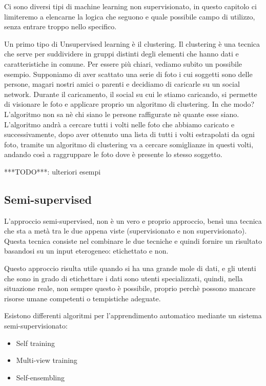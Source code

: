 \documentclass[12pt,italian]{report}
\begin{document}
Ci sono diversi tipi di machine learning non supervisionato, in questo capitolo ci limiteremo a elencarne la logica che seguono e quale possibile campo di utilizzo, senza entrare troppo nello specifico.

Un primo tipo di Unsupervised learning è il clustering. Il clustering è una tecnica che serve per suddividere in gruppi distinti degli elementi che hanno dati e caratteristiche in comune. Per essere più chiari, vediamo subito un possibile esempio.
Supponiamo di aver scattato una serie di foto i cui soggetti sono delle persone, magari nostri amici o parenti e decidiamo di caricarle su un social network. Durante il caricamento, il social su cui le stiamo caricando, si permette di visionare le foto e applicare proprio un algoritmo di clustering. In che modo? L'algoritmo non sa nè chi siano le persone raffigurate nè quante esse siano. L'algoritmo andrà a cercare tutti i volti nelle foto che abbiamo caricato e successivamente, dopo aver ottenuto una lista di tutti i volti estrapolati da ogni foto, tramite un algoritmo di clustering va a cercare somiglianze in questi volti, andando così a raggruppare le foto dove è presente lo stesso soggetto.

***TODO***: ulteriori esempi
\pagebreak
\subsection{Semi-supervised}

L'approccio semi-supervised, non è un vero e proprio approccio, bensì una tecnica che sta a metà tra le due appena viste (supervisionato e non supervisionato). Questa tecnica consiste nel combinare le due tecniche e quindi fornire un risultato basandosi su un input eterogeneo: etichettato e non.

Questo approccio risulta utile quando si ha una grande mole di dati, e gli utenti che sono in grado di etichettare i dati sono utenti specializzati, quindi, nella situazione reale, non sempre questo è possibile, proprio perchè possono mancare risorse umane competenti o tempistiche adeguate.

Esistono differenti algoritmi per l'apprendimento automatico mediante un sistema semi-supervisionato:
\begin{itemize}
	\item Self training
	\item Multi-view training
	\item Self-ensembling
\end{itemize}
\end{document}
